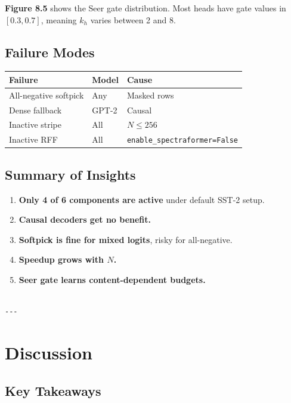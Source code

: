 \textbf{Figure 8.5} shows the Seer gate distribution. Most heads have gate values 
in $[0.3, 0.7]$, meaning $k_h$ varies between 2 and 8.

\subsection{Failure Modes}

\begin{table}[H]
\centering
\small
\begin{tabular}{lll}
\toprule
\textbf{Failure} & \textbf{Model} & \textbf{Cause} \\
\midrule
All-negative softpick & Any & Masked rows \\
Dense fallback & GPT-2 & Causal \\
Inactive stripe & All & $N \leq 256$ \\
Inactive RFF & All & \texttt{enable\_spectraformer=False} \\
\bottomrule
\end{tabular}
\end{table}

\subsection{Summary of Insights}

\begin{enumerate}
\item \textbf{Only 4 of 6 components are active} under default SST-2 setup.
\item \textbf{Causal decoders get no benefit.}
\item \textbf{Softpick is fine for mixed logits}, risky for all-negative.
\item \textbf{Speedup grows with $N$.}
\item \textbf{Seer gate learns content-dependent budgets.}
\end{enumerate}
\begin{lstlisting}

---
\end{lstlisting}

\section{Discussion}

\subsection{Key Takeaways}

